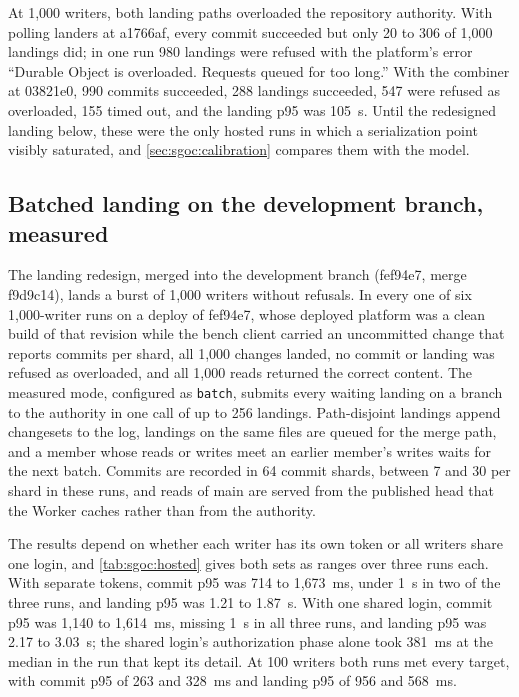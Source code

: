 \documentclass[11pt,letterpaper]{article}
\theoremstyle{definition}
\theoremstyle{remark}
\begin{document}
At 1,000 writers, both landing paths overloaded the repository authority. With polling landers at a1766af, every commit succeeded but only 20 to 306 of 1,000 landings did; in one run 980 landings were refused with the platform's error ``Durable Object is overloaded. Requests queued for too long.'' %
With the combiner at 03821e0, 990 commits succeeded, 288 landings succeeded, 547 were refused as overloaded, 155 timed out, and the landing p95 was 105~s. %
Until the redesigned landing below, these were the only hosted runs in which a serialization point visibly saturated, and \cref{sec:sgoc:calibration} compares them with the model.

\subsection{Batched landing on the development branch, measured}
\label{sec:sgoc:batch}

The landing redesign, merged into the development branch (fef94e7, merge f9d9c14), lands a burst of 1,000 writers without refusals. In every one of six 1,000-writer runs on a deploy of fef94e7, whose deployed platform was a clean build of that revision while the bench client carried an uncommitted change that reports commits per shard, all 1,000 changes landed, no commit or landing was refused as overloaded, and all 1,000 reads returned the correct content. %
The measured mode, configured as \texttt{batch}, submits every waiting landing on a branch to the authority in one call of up to 256 landings. Path-disjoint landings append changesets to the log, landings on the same files are queued for the merge path, and a member whose reads or writes meet an earlier member's writes waits for the next batch. Commits are recorded in 64 commit shards, between 7 and 30 per shard in these runs, and reads of main are served from the published head that the Worker caches rather than from the authority. %

The results depend on whether each writer has its own token or all writers share one login, and \cref{tab:sgoc:hosted} gives both sets as ranges over three runs each. With separate tokens, commit p95 was 714 to 1,673~ms, under 1~s in two of the three runs, and landing p95 was 1.21 to 1.87~s. %
With one shared login, commit p95 was 1,140 to 1,614~ms, missing 1~s in all three runs, and landing p95 was 2.17 to 3.03~s; the shared login's authorization phase alone took 381~ms at the median in the run that kept its detail. %
At 100 writers both runs met every target, with commit p95 of 263 and 328~ms and landing p95 of 956 and 568~ms. %
\end{document}
